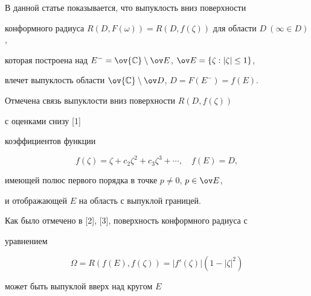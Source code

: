  


\date{} 




\pagestyle{plain} %


 




\maketitle 


\label{begin} 


 


 


 


В данной статье показывается, что выпуклость вниз поверхности 


конформного радиуса $R(D,F(\omega))=R(D,f(\zeta))$ для области $D\ 


(\infty\in D)$,  


которая построена над $E^-=\ov{\Bbb C}\setminus\ov E$, $\ov 


E=\{\zeta:|\zeta|\le 1\}$, 


влечет выпуклость области $\ov{\Bbb C}\setminus\ov D$, $D=F(E^-)=f(E)$. 


Отмечена связь выпуклости вниз поверхности $R(D,f(\zeta))$ 


с оценками снизу [1] 


коэффициентов функции 


$$ 


f(\zeta)=\zeta+c_2\zeta^2+c_3\zeta^3+\dotsb,\quad f(E)=D, 


$$ 


имеющей полюс первого порядка в точке $p\ne0$, $p\in\ov E$, 


и отображающей $E$ на область с выпуклой границей. 


 


Как было отмечено в [2], [3], поверхность конформного радиуса с 


уравнением 


$$ 


\Omega=R(f(E),f(\zeta))=|f'(\zeta)|(1-|\zeta|^2) 


$$ 


может быть выпуклой вверх над кругом $E$ 


